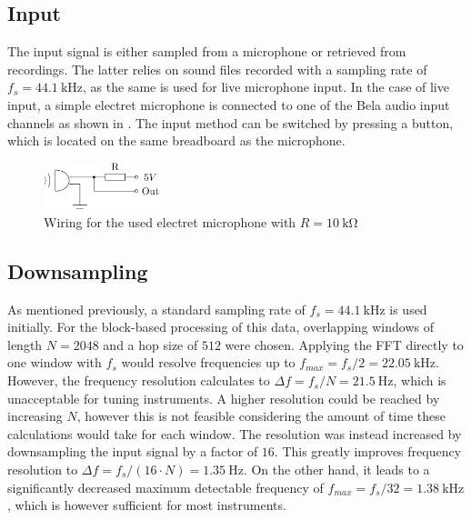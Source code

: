 \documentclass[a4paper, 12pt]{article}
\begin{document}
\subsection{Input}
The input signal is either sampled from a microphone or retrieved from recordings. The latter relies on sound files recorded with a sampling rate of $f_s=\SI{44.1}{\kilo\hertz}$, as the same is used for live microphone input. In the case of live input, a simple electret microphone is connected to one of the Bela audio input channels as shown in . The input method can be switched by pressing a button, which is located on the same breadboard as the microphone.

\begin{figure}[h!]
	\centering
	\includegraphics[width=0.3\textwidth]{mic-wiring.png}
	\caption{Wiring for the used electret microphone with $R=\SI{10}{\kilo\ohm}$}
	\label{fig:mic-wiring}
\end{figure}

\subsection{Downsampling}
As mentioned previously, a standard sampling rate of $f_s=\SI{44.1}{\kilo\hertz}$ is used initially. For the block-based processing of this data, overlapping windows of length $N=2048$ and a hop size of $512$ were chosen. Applying the FFT directly to one window with $f_s$ would resolve frequencies up to $f_{max}=f_s/2=\SI{22.05}{\kilo\hertz}$. However, the frequency resolution calculates to $\Delta f=f_s/N=\SI{21.5}{\hertz}$, which is unacceptable for tuning instruments. A higher resolution could be reached by increasing $N$, however this is not feasible considering the amount of time these calculations would take for each window. The resolution was instead increased by downsampling the input signal by a factor of $16$. This greatly improves frequency resolution to $\Delta f=f_s/(16 \cdot N) =\SI{1.35}{\hertz}$. On the other hand, it leads to a significantly decreased maximum detectable frequency of $f_{max}=f_s/32=\SI{1.38}{\kilo\hertz}$, which is however sufficient for most instruments.
\end{document}
